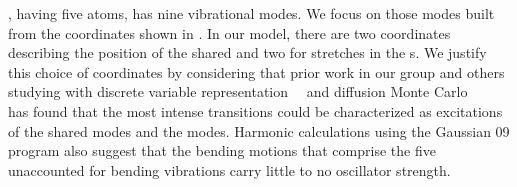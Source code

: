 %
%

\hfive{}, having five atoms, has nine vibrational modes. We focus on those modes built from the coordinates shown in . In our model, there are two coordinates describing the position of the shared \hplus{} and two for stretches in the \htwo{}s. We justify this choice of coordinates by considering that prior work in our group and others studying \hfive{} with discrete variable representation~\cite{Lin2012}~\cite{Lin2015} and diffusion Monte Carlo~\cite{Lin2013}~\cite{Lin2015}~\cite{Marlett2015} has found that the most intense transitions could be characterized as excitations of the shared \hplus{} modes and the  \htwo{} modes. Harmonic calculations using the Gaussian 09 program\cite{Gaussian09} also suggest that the bending motions that comprise the five unaccounted for bending vibrations carry little to no oscillator strength.


%
